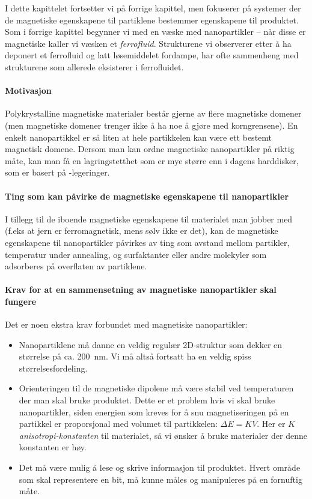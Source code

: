 I dette kapittelet fortsetter vi på forrige kapittel, men fokuserer på systemer der de magnetiske egenskapene til partiklene bestemmer egenskapene til produktet. Som i forrige kapittel begynner vi med en væske med nanopartikler -- når disse er magnetiske kaller vi væsken et \emph{ferrofluid}. Strukturene vi observerer etter å ha deponert et ferrofluid og latt løsemiddelet fordampe, har ofte sammenheng med strukturene som allerede eksisterer i ferrofluidet. 

\paragraph{Motivasjon} Polykrystalline magnetiske materialer består gjerne av flere magnetiske domener (men magnetiske domener trenger ikke å ha noe å gjøre med korngrensene). En enkelt nanopartikkel er så liten at hele partikkelen kan være ett bestemt magnetisk domene. Dersom man kan ordne magnetiske nanopartikler på riktig måte, kan man få en lagringstetthet som er mye større enn i dagens harddisker, som er basert på -legeringer.

\paragraph{Ting som kan påvirke de magnetiske egenskapene til nanopartikler} I tillegg til de iboende magnetiske egenskapene til materialet man jobber med (f.eks at jern er ferromagnetisk, mens sølv ikke er det), kan de magnetiske egenskapene til nanopartikler påvirkes av ting som avstand mellom partikler, temperatur under annealing, og surfaktanter eller andre molekyler som adsorberes på overflaten av partiklene.

\paragraph{Krav for at en sammensetning av magnetiske nanopartikler skal fungere} Det er noen ekstra krav forbundet med magnetiske nanopartikler:
\begin{itemize}
	\item Nanopartiklene må danne en veldig regulær 2D-struktur som dekker en størrelse på ca. \SI{200}{\nano\meter}. Vi må altså fortsatt ha en veldig spiss størrelsesfordeling.
	\item Orienteringen til de magnetiske dipolene må være stabil ved temperaturen der man skal bruke produktet. Dette er et problem hvis vi skal bruke nanopartikler, siden energien som kreves for å snu magnetiseringen på en partikkel er proporsjonal med volumet til partikkelen: $\Delta E = KV$. Her er $K$ \emph{anisotropi-konstanten} til materialet, så vi ønsker å bruke materialer der denne konstanten er høy. 
	\item Det må være mulig å lese og skrive informasjon til produktet. Hvert område som skal representere en bit, må kunne måles og manipuleres på en fornuftig måte.
\end{itemize}

